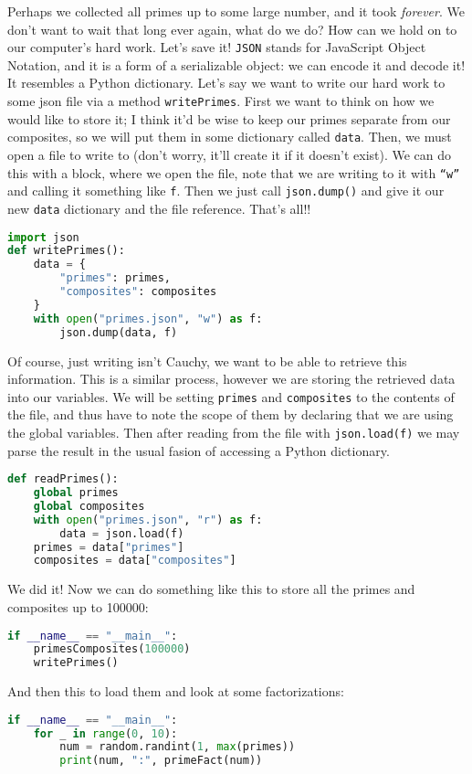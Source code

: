 \documentclass[12pt, twoside, reqno]{book}
\begin{document}
Perhaps we collected all primes up to some large number, and it took \textit{forever}. We don't want to wait that long ever again, what do we do? How can we hold on to our computer's hard work. Let's save it! \texttt{JSON} stands for JavaScript Object Notation, and it is a form of a serializable object: we can encode it and decode it! It resembles a Python dictionary. Let's say we want to write our hard work to some json file via a method \texttt{writePrimes}. First we want to think on how we would like to store it; I think it'd be wise to keep our primes separate from our composites, so we will put them in some dictionary called \texttt{data}. Then, we must open a file to write to (don't worry, it'll create it if it doesn't exist). We can do this with a block, where we open the file, note that we are writing to it with \texttt{``w''} and calling it something like \texttt{f}. Then we just call \texttt{json.dump()} and give it our new \texttt{data} dictionary and the file reference. That's all!!
\begin{lstlisting}[language=Python]
import json
def writePrimes():
    data = {
        "primes": primes,
        "composites": composites
    }
    with open("primes.json", "w") as f:
        json.dump(data, f)
\end{lstlisting}

Of course, just writing isn't Cauchy, we want to be able to retrieve this information. This is a similar process, however we are storing the retrieved data into our variables. We will be setting \texttt{primes} and \texttt{composites} to the contents of the file, and thus have to note the scope of them by declaring that we are using the global variables. Then after reading from the file with \texttt{json.load(f)} we may parse the result in the usual fasion of accessing a Python dictionary.
\begin{lstlisting}[language=Python]
def readPrimes():
    global primes
    global composites
    with open("primes.json", "r") as f:
        data = json.load(f)
    primes = data["primes"]
    composites = data["composites"]
\end{lstlisting}

We did it! Now we can do something like this to store all the primes and composites up to 100000:
\begin{lstlisting}[language=Python]
if __name__ == "__main__":
    primesComposites(100000)
    writePrimes()
\end{lstlisting}

And then this to load them and look at some factorizations:
\begin{lstlisting}[language=Python]
if __name__ == "__main__":
    for _ in range(0, 10):
        num = random.randint(1, max(primes))
        print(num, ":", primeFact(num))
\end{lstlisting}
\end{document}
